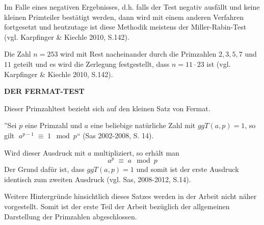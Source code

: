 Im Falle eines negativen Ergebnisses, d.h. falls der Test
negativ ausfällt und keine kleinen Primteiler bestätigt
werden, dann wird mit einem anderen Verfahren fortgesetzt
und heutzutage ist diese Methodik meistens der 
Miller-Rabin-Test (vgl. Karpfinger \& Kiechle 2010, S.142).

\begin{example}
Die Zahl $n = 253$ wird mit Rest nacheinander durch die
Primzahlen $2, 3, 5, 7$ und $11$ geteilt und es wird die
Zerlegung festgestellt, dass $n = 11\cdot 23$ ist
(vgl. Karpfinger \& Kiechle 2010, S.142).
\end{example}
\vspace{.3cm}

\textbf{DER FERMAT-TEST}

Dieser Primzahltest bezieht sich auf den kleinen Satz
von Fermat.
\begin{theorem}
''Sei $p$ eine Primzahl und $a$ eine beliebige natürliche
Zahl mit $ggT(a,p)=1$, so gilt $\; a^{p-1} \;\equiv\; 1\mod p$“
(Sas 2002-2008, S. 14).
\end{theorem}

Wird dieser Ausdruck mit $a$ multipliziert, so erhält man
\[
 a^p \;\equiv\; a \mod p
\]
Der Grund dafür ist, dass $ggT(a,p)=1$ und somit ist der
erste Ausdruck identisch zum zweiten Ausdruck
(vgl. Sas, 2008-2012, S.14).

Weitere Hintergründe hinsichtlich dieses Satzes werden
in der Arbeit nicht näher vorgestellt.
Somit ist der erste Teil der Arbeit bezüglich der
allgemeinen Darstellung der Primzahlen abgeschlossen.
